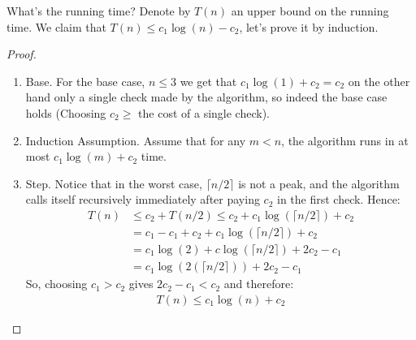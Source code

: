 What's the running time? Denote by $T\left( n \right)$ an upper bound on the running time. We claim that $T(n) \le c_{1} \log (n) - c_{2}$, let's prove it by induction.
\begin{proof}
     
\begin{enumerate}
  \item Base. For the base case, $n \le 3$ we get that $c_{1} \log(1) + c_{2} =  c_{2}$ on the other hand only a single check made by the algorithm, so indeed the base case holds (Choosing $c_{2} \ge$ the cost of a single check).
  \item Induction Assumption. Assume that for any $m < n$, the algorithm runs in at most $c_{1} \log(m) + c_{2}$ time.
  \item Step. Notice that in the worst case, $\lceil n/2 \rceil$ is not a peak, and the algorithm calls itself recursively immediately after paying $c_{2}$ in the first check. Hence: \begin{equation*}
      \begin{split}    
	T\left(n\right) & \le c_{2} + T\left(n/2\right) \le c_{2} + c_{1} \log\left( \lceil n/2 \rceil \right) + c_{2}\\
	& = c_{1} - c_{1} + c_{2} + c_{1} \log\left( \lceil n/2 \rceil \right) + c_{2}\\
	& = c_{1} \log (2) +  c \log\left( \lceil n/2 \rceil  \right) + 2c_{2} - c_{1} \\
	& = c_{1} \log\left(2 \left(\lceil n/2 \rceil \right) \right) + 2c_{2} - c_{1}
      \end{split}
    \end{equation*}
    So, choosing $c_{1} > c_{2}$ gives $2c_{2} - c_{1} < c_{2}$ and therefore:
    \begin{equation*}
      \begin{split}
	T\left(n\right) \le c_{1} \log \left( n  \right) + c_{2}  
      \end{split}
    \end{equation*}
\end{enumerate}
\end{proof}




